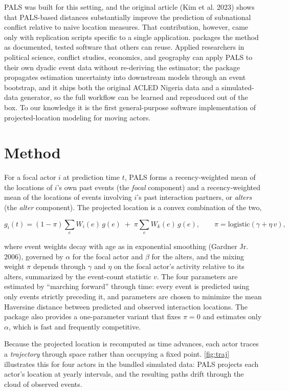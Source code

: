 \documentclass[10pt,a4paper,onecolumn]{article}
\let\textttOrig=\texttt
\def\texttt#1{\expandafter\textttOrig{\seqsplit{#1}}}
\begin{document}
PALS was built for this setting, and the original article (Kim et al.
2023) shows that PALS-based distances substantially improve the
prediction of subnational conflict relative to naive location measures.
That contribution, however, came only with replication scripts specific
to a single application. \texttt{palsr} packages the method as
documented, tested software that others can reuse. Applied researchers
in political science, conflict studies, economics, and geography can
apply PALS to their own dyadic event data without re-deriving the
estimator; the package propagates estimation uncertainty into downstream
models through an event bootstrap, and it ships both the original ACLED
Nigeria data and a simulated-data generator, so the full workflow can be
learned and reproduced out of the box. To our knowledge it is the first
general-purpose software implementation of projected-location modeling
for moving actors.

\section{Method}\label{method}

For a focal actor \(i\) at prediction time \(t\), PALS forms a
recency-weighted mean of the locations of \(i\)'s own past events (the
\emph{focal} component) and a recency-weighted mean of the locations of
events involving \(i\)'s past interaction partners, or \emph{alters}
(the \emph{alter} component). The projected location is a convex
combination of the two,

\[
g_i(t) = (1-\pi)\sum_e W_i(e)\, g(e) \;+\; \pi \sum_e W_k(e)\, g(e),
\qquad \pi = \mathrm{logistic}(\gamma + \eta\, v),
\]

where event weights decay with age as in exponential smoothing (Gardner
Jr. 2006), governed by \(\alpha\) for the focal actor and \(\beta\) for
the alters, and the mixing weight \(\pi\) depends through \(\gamma\) and
\(\eta\) on the focal actor's activity relative to its alters,
summarized by the event-count statistic \(v\). The four parameters are
estimated by ``marching forward'' through time: every event is predicted
using only events strictly preceding it, and parameters are chosen to
minimize the mean Haversine distance between predicted and observed
interaction locations. The package also provides a one-parameter variant
that fixes \(\pi = 0\) and estimates only \(\alpha\), which is fast and
frequently competitive.

Because the projected location is recomputed as time advances, each
actor traces a \emph{trajectory} through space rather than occupying a
fixed point. \autoref{fig:traj} illustrates this for four actors in the
bundled simulated data: PALS projects each actor's location at yearly
intervals, and the resulting paths drift through the cloud of observed
events.
\end{document}
